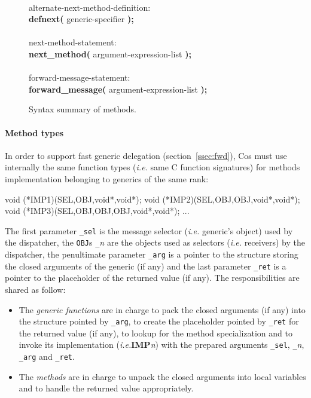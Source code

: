 \documentclass[preprint,10pt]{sigplanconf}
\newcommand{\abbrev}[1]{{\em #1}\xspace}
\newcommand{\ie}{\abbrev{i.e.}}
\newcommand{\ProgLang}[1]{{\sc #1}\xspace}
\newcommand{\Cos}       {\ProgLang{Cos}}
\newcommand{\ttb}[1]{{\normalfont\ttfamily\bfseries #1}}
\newcommand{\code}[1]{\lstinline[language=COS,style=samplecode]|#1|}
\begin{document}
\begin{figure}
\begin{center}
{\begin{tabbing}
\\
alternate-next-method-definition: \\
\> \ttb{defnext(} generic-specifier \ttb{);}\\
\\
next-method-statement: \\
\> \ttb{next\_method(} argument-expression-list \ttb{);}\\
\\
forward-message-statement: \\
\> \ttb{forward\_message(} argument-expression-list \ttb{);}
\end{tabbing}
\vspace{-1mm}}
\end{center}
\caption{Syntax summary of methods.\label{fig:mthgram}}
\end{figure}


\paragraph{Method types}

In order to support fast generic delegation (section~\ref{ssec:fwd}), \Cos must use internally the same function types (\ie same C function signatures) for methods implementation belonging to generics of the same rank:
\begin{COS}
void (*IMP1)(SEL,OBJ,void*,void*);
void (*IMP2)(SEL,OBJ,OBJ,void*,void*);
void (*IMP3)(SEL,OBJ,OBJ,OBJ,void*,void*);
...
\end{COS}
\vspace{-0.2em}\noindent
The first parameter \code{_sel} is the message selector (\ie generic's object) used by the dispatcher, the \code{OBJ}s \code{_}{\em n} are the objects used as selectors (\ie receivers) by the dispatcher, the penultimate parameter \code{_arg} is a pointer to the structure storing the closed arguments of the generic (if any) and the last parameter \code{_ret} is a pointer to the placeholder of the returned value (if any). The responsibilities are shared as follow:

\begin{itemize}
\item The {\em generic functions} are in charge to pack the closed arguments (if any) into the structure pointed by \code{_arg}, to create the placeholder pointed by \code{_ret} for the returned value (if any), to lookup for the method specialization and to invoke its implementation (\ie {\bf\ttfamily IMP}{\em n}) with the prepared arguments \code{_sel}, \code{_}{\em n}, \code{_arg} and \code{_ret}.

\item The {\em methods} are in charge to unpack the closed arguments into local variables and to handle the returned value appropriately.
\end{itemize}
\end{document}
